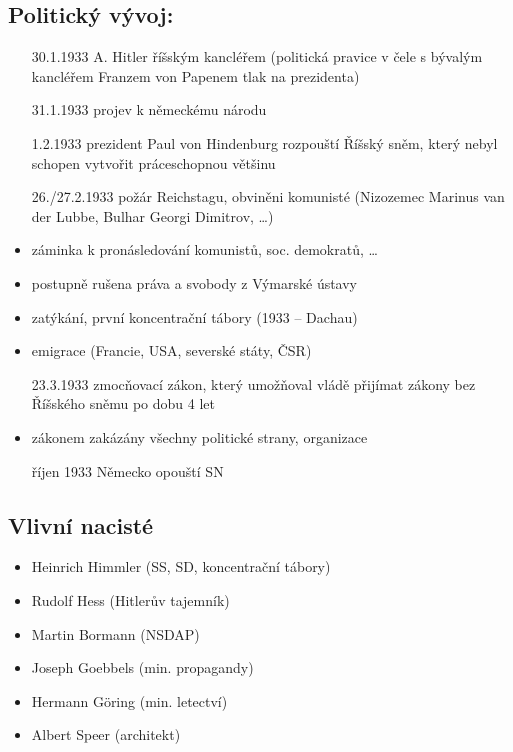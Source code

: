 \documentclass{article}
\begin{document}
\subsection*{Politický vývoj:}
\begin{itemize}
    \item[30.1.1933] A. Hitler říšským kancléřem (politická pravice v čele s bývalým kancléřem Franzem von Papenem tlak na prezidenta)
    \item[31.1.1933] projev k německému národu
    \item [1.2.1933] prezident Paul von Hindenburg rozpouští Říšský sněm, který nebyl schopen vytvořit práceschopnou většinu
    \item [26./27.2.1933] požár Reichstagu, obviněni komunisté (Nizozemec Marinus van der Lubbe, Bulhar Georgi Dimitrov, …)
    \item záminka k pronásledování komunistů, soc. demokratů, …
    \item postupně rušena práva a svobody z Výmarské ústavy
    \item zatýkání, první koncentrační tábory (1933 – Dachau)
    \item emigrace (Francie, USA, severské státy, ČSR)
    \item[23.3.1933] zmocňovací zákon, který umožňoval vládě přijímat zákony bez Říšského sněmu po dobu 4 let
    \item zákonem zakázány všechny politické strany, organizace
    \item[říjen 1933] Německo opouští SN
\end{itemize}

\subsection*{Vlivní nacisté}
\begin{itemize}
    \item Heinrich Himmler (SS, SD, koncentrační tábory)
    \item Rudolf Hess (Hitlerův tajemník)
    \item Martin Bormann (NSDAP)
    \item Joseph Goebbels (min. propagandy)
    \item Hermann Göring (min. letectví)
    \item Albert Speer (architekt)
\end{itemize}
\end{document}
